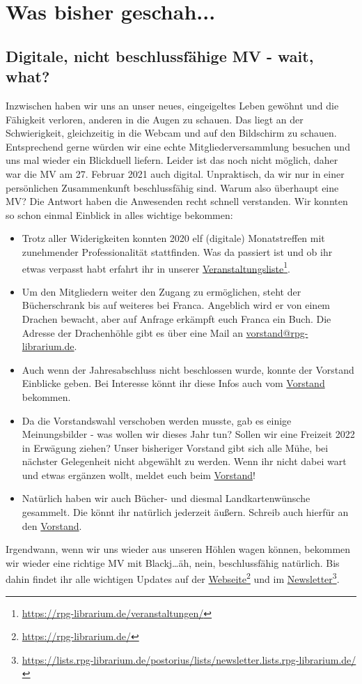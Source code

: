 \documentclass[final]{multiversum}
\newcommand\fnref[2]{\href{#1}{#2}\footnote{\url{#1}}}
\begin{document}
\makemultititle
%

\section{Was bisher geschah...}

\subsection{Digitale, nicht beschlussfähige MV - wait, what?}
Inzwischen haben wir uns an unser neues, eingeigeltes Leben gewöhnt und die Fähigkeit verloren, anderen in die Augen zu schauen.
Das liegt an der Schwierigkeit, gleichzeitig in die Webcam und auf den Bildschirm zu schauen.
Entsprechend gerne würden wir eine echte Mitgliederversammlung besuchen und uns mal wieder ein Blickduell liefern. 
Leider ist das noch nicht möglich, daher war die MV am 27. Februar 2021 auch digital. 
Unpraktisch, da wir nur in einer persönlichen Zusammenkunft beschlussfähig sind.
Warum also überhaupt eine MV?
Die Antwort haben die Anwesenden recht schnell verstanden.
Wir konnten so schon einmal Einblick in alles wichtige bekommen:
\begin{itemize}
\item Trotz aller Widerigkeiten konnten 2020 elf (digitale) Monatstreffen mit zunehmender Professionalität stattfinden.
Was da passiert ist und ob ihr etwas verpasst habt erfahrt ihr in unserer \fnref{https://rpg-librarium.de/veranstaltungen/}{Veranstaltungsliste}.
\item Um den Mitgliedern weiter den Zugang zu ermöglichen, steht der Bücherschrank bis auf weiteres bei Franca. 
Angeblich wird er von einem Drachen bewacht, aber auf Anfrage erkämpft euch Franca ein Buch. 
Die Adresse der Drachenhöhle gibt es über eine Mail an \href{mailto:vorstand@rpg-librarium.de}{vorstand@rpg-librarium.de}.
\item Auch wenn der Jahresabschluss nicht beschlossen wurde, konnte der Vorstand Einblicke geben. 
Bei Interesse könnt ihr diese Infos auch vom \href{mailto:vorstand@rpg-librarium.de}{Vorstand} bekommen.
\item Da die Vorstandswahl verschoben werden musste, gab es einige Meinungsbilder - was wollen wir dieses Jahr tun? 
Sollen wir eine Freizeit 2022 in Erwägung ziehen? 
Unser bisheriger Vorstand gibt sich alle Mühe, bei nächster Gelegenheit nicht abgewählt zu werden. 
Wenn ihr nicht dabei wart und etwas ergänzen wollt, meldet euch beim \href{mailto:vorstand@rpg-librarium.de}{Vorstand}!
\item Natürlich haben wir auch Bücher- und diesmal Landkartenwünsche gesammelt.
Die könnt ihr natürlich jederzeit äußern. Schreib auch hierfür an den \href{mailto:vorstand@rpg-librarium.de}{Vorstand}.
\end{itemize}
Irgendwann, wenn wir uns wieder aus unseren Höhlen wagen können, bekommen wir wieder eine richtige MV mit Blackj\dots äh, nein, beschlussfähig natürlich. 
Bis dahin findet ihr alle wichtigen Updates auf der \fnref{https://rpg-librarium.de/}{Webseite} und im \fnref{https://lists.rpg-librarium.de/postorius/lists/newsletter.lists.rpg-librarium.de/}{Newsletter}.
\end{document}
